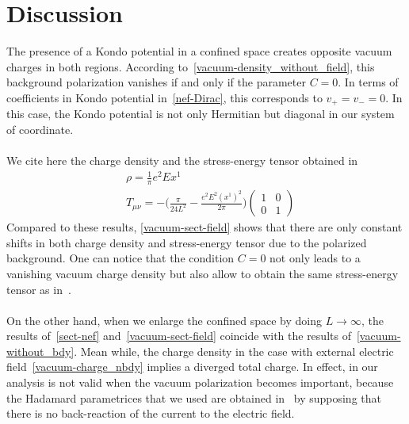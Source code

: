 \section{Discussion}
The presence of a Kondo potential in a confined space creates opposite vacuum charges in both regions.
According to~\cref{vacuum-density_without_field}, 
this background polarization vanishes if and only if the parameter $C = 0$. 
In terms of coefficients in Kondo potential in~\cref{nef-Dirac},
this corresponds to $v_+ = v_- = 0$.
In this case, the Kondo potential is not only Hermitian but diagonal in our system of coordinate. \\\\
%
We cite here the charge density and the stress-energy tensor obtained in~\cite{Zahn2015}
\begin{equation*}
\begin{split}
& \rho = \frac 1 \pi e^2 Ex^1 \\
& T_{\mu\nu} = - \big( \frac{\pi}{24L^2} - \frac{e^2 E^2 (x^1)^2}{2\pi}\big) \begin{pmatrix} 1 & 0 \\ 0 & 1 \end{pmatrix}
\end{split}
\end{equation*}
Compared to these results, 
\cref{vacuum-sect-field} shows that there are only constant shifts in both charge density and stress-energy tensor due to the polarized background.
One can notice that the condition $C = 0$ not only leads to a vanishing vacuum charge density but also allow to obtain the same stress-energy tensor as in~\cite{Zahn2015}.
\\\\
On the other hand, when we enlarge the confined space by doing $L \rightarrow \infty$, 
the results of~\cref{sect-nef} and~\cref{vacuum-sect-field} coincide with the results of~\cref{vacuum-without_bdy}.
Mean while, the charge density in the case with external electric field~\cref{vacuum-charge_nbdy} implies a diverged total charge.
In effect, in our analysis is not valid when the vacuum polarization becomes important,
because the Hadamard parametrices that we used are obtained  in~\cite{Zahn2015} by supposing that there is no back-reaction of the current to the electric field.
































